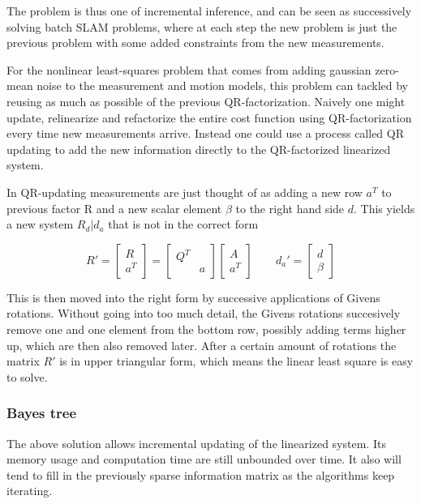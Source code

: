 The problem is thus one of incremental inference, and can be seen as successively solving batch SLAM problems, where at each step the new problem is just the previous problem with some added constraints from the new measurements.

For the nonlinear least-squares problem that comes from adding gaussian zero-mean noise to the measurement and motion models, this problem can tackled by reusing as much as possible of the previous QR-factorization. Naively one might update, relinearize and refactorize the entire cost function using QR-factorization every time new measurements arrive. Instead one could use a process called QR updating to add the new information directly to the QR-factorized linearized system. 

In QR-updating measurements are just thought of as adding a new row $a^T$ to previous factor R and a new scalar element $\beta$ to the right hand side $d$. This yields a new system $R_d|d_a$ that is not in the correct form

\begin{equation}
    R' = \begin{bmatrix} R \\ a^T \end{bmatrix}=\begin{bmatrix} Q^T &  \\ & a \end{bmatrix}\begin{bmatrix} A \\ a^T \end{bmatrix} \quad \quad d_a' = \begin{bmatrix} d \\ \beta  \end{bmatrix}
\end{equation}

This is then moved into the right form by successive applications of Givens rotations\cite{GivensRot}. Without going into too much detail, the Givens rotations succesively remove one and one element from the bottom row, possibly adding terms higher up, which are then also removed later. After a certain amount of rotations the matrix $R'$ is in upper triangular form, which means the linear least square is easy to solve.

\subsubsection{Bayes tree}

The above solution allows incremental updating of the linearized system. Its memory usage and computation time are still unbounded over time. It also will tend to fill in the previously sparse information matrix as the algorithms keep iterating.

